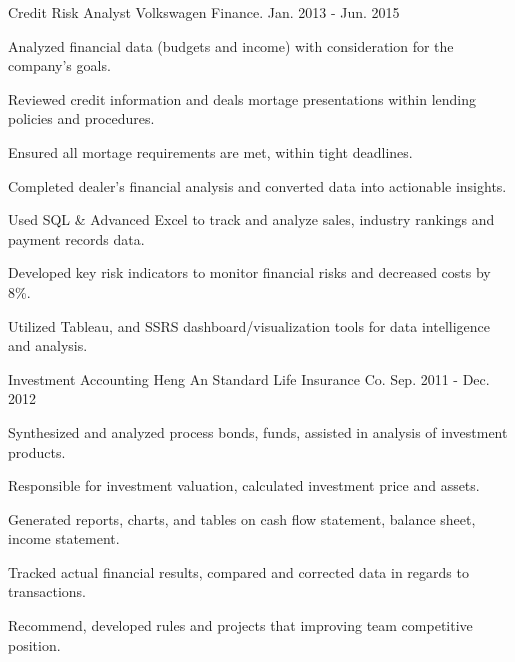 \documentclass[11pt, a4paper]{awesome-cv}
\begin{document}
\begin{cventries}

  \cventry
    {Credit Risk Analyst} %
    {Volkswagen Finance.} %
    {} %
    {Jan. 2013 - Jun. 2015} %
    {
      \begin{cvitems} %
        \item {Analyzed financial data (budgets and income) with consideration for the company's goals.}
        \item {Reviewed credit information and deals mortage presentations within lending policies and procedures.}
        \item {Ensured all mortage requirements are met, within tight deadlines.}
        \item {Completed dealer's financial analysis and converted data into actionable insights.}
        \item {Used SQL \& Advanced Excel to track and analyze sales, industry rankings and payment records data.}
        \item {Developed key risk indicators to monitor financial risks and decreased costs by 8\%.}
        \item {Utilized Tableau, and SSRS dashboard/visualization tools for data intelligence and analysis.}
      \end{cvitems}
    }

  \cventry
    {Investment Accounting} %
    {Heng An Standard Life Insurance Co.} %
    {} %
    {Sep. 2011 - Dec. 2012} %
    {
      \begin{cvitems} %
        \item {Synthesized and analyzed process bonds, funds, assisted in analysis of investment products.}
        \item {Responsible for investment valuation, calculated investment price and assets.}
        \item {Generated reports, charts, and tables on cash flow statement, balance sheet, income statement.}
        \item {Tracked actual financial results, compared and corrected data in regards to transactions.}
        \item {Recommend, developed rules and projects that improving team competitive position.}
      \end{cvitems}
    }


\end{cventries}
\end{document}
